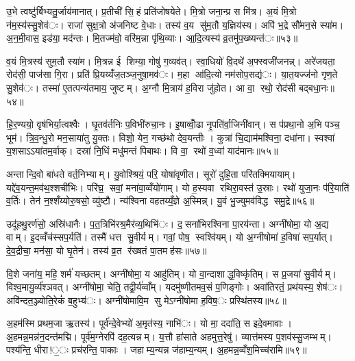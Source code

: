 उ॒भे त्वष्टु॑र्बिभ्यतु॒र्जाय॑मानात्। प्र॒तीची॑ सि॒हं प्रति॑जोषयेते। मि॒त्रो जना॒न्प्र स मि॑त्र। अ॒यं मि॒त्रो न॑म॒स्य॑स्सु॒शेव॑ः। राजा॑ सुक्ष॒त्रो अ॑जनिष्ट वे॒धाः। तस्य॑ व॒य सु॑म॒तौ य॒ज्ञिय॑स्य। अपि॑ भ॒द्रे सौ॑मन॒से स्या॑म। अ॒न॒मी॒वास॒ इड॑या॒ मद॑न्तः। मि॒तज्म॑वो॒ वरि॑म॒न्ना पृ॑थि॒व्याः। आ॒दि॒त्यस्य॑ व्र॒तमु॑प॒ख्ष्यन्त॑ः॥५३॥

व॒यं मि॒त्रस्य॑ सुम॒तौ स्या॑म। मि॒त्रन्न ई शिम्या॒ गोषु॑ ग॒व्यव॑त्। स्वा॒धियो॑ वि॒दथे॑ अ॒फ्स्वजी॑जनन्न्। अरे॑जयता॒ रोद॑सी॒ पाज॑सा गि॒रा। प्रति॑ प्रि॒यय्यँ॑ज॒तञ्ज॒नुषा॒मव॑ः। म॒हा आ॑दि॒त्यो नम॑सोप॒सद्य॑ः। या॒त॒यज्ज॑नो गृण॒ते सु॒शेव॑ः। तस्मा॑ ए॒तत्पन्य॑तमाय॒ जुष्टम्। अ॒ग्नौ मि॒त्राय॑ ह॒विरा जु॑होत। आ वा॒ रथो॒ रोद॑सी बद्बधा॒नः॥५४॥

हि॒र॒ण्ययो॒ वृष॑भिर्या॒त्वश्वैः। घृ॒तव॑र्तनिः प॒विभी॑रुचा॒नः। इ॒षाव्वोँ॒ढा नृ॒पति॑र्वा॒जिनी॑वान्। स प॑प्रथा॒नो अ॒भि पञ्च॒ भूम॑। त्रि॒व॒न्धु॒रो मन॒साया॑तु यु॒क्तः। विशो॒ येन॒ गच्छ॑थो देव॒यन्तीः। कुत्रा॑ चि॒द्याम॑मश्विना॒ दधा॑ना। स्वश्वा॑ य॒शसाऽऽया॑तम॒र्वाक्। दस्रा॑ नि॒धिं मधु॑मन्तं पिबाथः। वि वा॒ रथो॑ व॒ध्वा॑ याद॑मानः॥५५॥

अन्तान्दि॒वो बा॑धते वर्त॒निभ्याम्। यु॒वोश्श्रियं॒ परि॒ योषा॑वृणीत। सूरो॑ दुहि॒ता परि॑तक्मियायाम्। यद्दे॑व॒यन्त॒मव॑थ॒श्शची॑भिः। परि॑घ्र॒ सवां॒ मना॑वा॒व्वँयो॑गाम्। यो ह॒स्यवा रथिरा॒वस्त॑ उ॒स्राः। रथो॑ युजा॒नः प॑रि॒याति॑ व॒र्तिः। तेन॑ न॒श्शँय्योरु॒षसो॒ व्यु॑ष्टौ। न्य॑श्विना वहतय्यँ॒ज्ञे अ॒स्मिन्न्। यु॒वं भु॒ज्युमव॑विद्ध समु॒द्रे॥५६॥

उदू॑हथु॒रर्ण॑सो॒ अस्रि॑धानैः। प॒त॒त्रिभि॑रश्र॒मैर॑व्य॒थिभि॑ः। द॒सना॑भिरश्विना पा॒रय॑न्ता। अग्नी॑षोमा॒ यो अ॒द्य वाम्। इ॒दव्वँच॑स्सप॒र्यति॑। तस्मै॑ धत्त सु॒वीर्यम्। गवां॒ पोष॒ स्वश्वि॑यम्। यो अ॒ग्नीषोमा॑ ह॒विषा॑ सप॒र्यात्। दे॒व॒द्रीचा॒ मन॑सा॒ यो घृ॒तेन॑। तस्य॑ व्र॒त र॑ख्षतं पा॒तमह॑सः॥५७॥

वि॒शे जना॑य॒ महि॒ शर्म॑ यच्छतम्। अग्नी॑षोमा॒ य आहु॑तिम्। यो वा॒न्दाशाद्ध॒विष्कृ॑तिम्। स प्र॒जया॑ सु॒वीर्यम्। विश्व॒मायु॒र्व्य॑श्ञवत्। अग्नी॑षोमा॒ चेति॒ तद्वी॒र्य॑व्वाँम्। यदमु॑ष्णीतमव॒सं प॒णिङ्गोः। अवा॑तिरतं॒ प्रथ॑यस्य॒ शेष॑ः। अवि॑न्दत॒ञ्ज्योति॒रेकं॑ ब॒हुभ्य॑ः। अग्नी॑षोमावि॒म सु मेऽग्नी॑षोमा ह॒विष॒ः प्रस्थि॑तस्य॥५८॥


अ॒हम॑स्मि प्रथम॒जा ऋ॒तस्य॑। पूर्व॑न्दे॒वेभ्यो॑ अ॒मृत॑स्य॒ नाभि॑ः। यो मा॒ ददा॑ति॒ स इदे॒वमावाः। अ॒हमन्न॒मन्न॑न॒दन्त॑मद्मि। पूर्व॑म॒ग्नेरपि॑ दह॒त्यन्नम्। य॒त्तौ हा॑साते अहमुत्त॒रेषु॑। व्यात्त॑मस्य प॒शव॑स्सु॒जम्भम्। पश्य॑न्ति॒ धीरा!॒ः प्रच॑रन्ति॒ पाकाः। जहाम्य॒न्यन्न ज॑हाम्य॒न्यम्। अ॒हमन्न॒व्वँश॒मिच्च॑रामि॥५९॥

